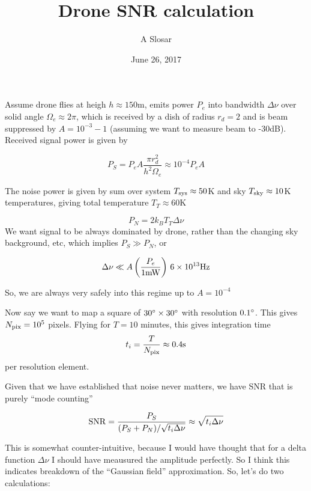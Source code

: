 \documentclass{article}
\begin{document}
\title{Drone SNR calculation}
\author{A Slosar}
\date{June 26, 2017}
\maketitle

\newcommand{\Dnu}{\Delta \nu}
Assume drone flies at heigh $h\approx150$m, emits power $P_e$ into
bandwidth $\Dnu$ over solid angle
$\Omega_e\approx 2\pi$, which is received by a dish of radius $r_d=2$
and is beam suppressed by $A=10^{-3}-1$ (assuming we want to measure
beam to -30dB).  Received signal power is given by

\begin{equation}
  P_S = P_e A \frac{\pi r_d^2}{h^2\Omega_e} \approx 10^{-4} P_e A
\end{equation}

The noise power is given by sum over system $T_{\rm sys}\approx 50$K
and sky $T_{\rm sky} \approx 10$K temperatures, giving total
temperature $T_T\approx 60$K

\begin{equation}
  P_N = 2 k_B T_T \Dnu
\end{equation}
We want signal to be always dominated by drone, rather than the
changing sky background, etc, which implies $P_S \gg P_N$, or 

\begin{equation}
  \Dnu \ll A \left(\frac{P_e}{\rm 1  mW}\right) \, 6\times 10^{13} {\rm Hz} 
\end{equation}

So, we are always very safely into this regime up to $A=10^{-4}$

Now say we want to map a square of $30\degree\times30\degree$
with resolution $0.1\degree$. This gives $N_{\rm pix} = 10^5$
pixels. Flying for $T=10$ minutes, this gives integration time
\begin{equation}
  t_i = \frac{T}{N_{\rm pix}}\approx 0.4{\rm s}
\end{equation}
per resolution element.

Given that we have established that noise never matters, we have SNR
that is purely ``mode counting''

\begin{equation}
  {\rm SNR} = \frac{P_S}{(P_S + P_N) / \sqrt{t_i \Dnu }} \approx \sqrt{t_i \Dnu}
\end{equation}

This is somewhat counter-intuitive, because I would have thought that
for a delta function $\Dnu$ I should have meausured the amplitude
perfectly. So I think this indicates breakdown of the ``Gaussian
field'' approximation. So, let's do two calculations:
\end{document}
